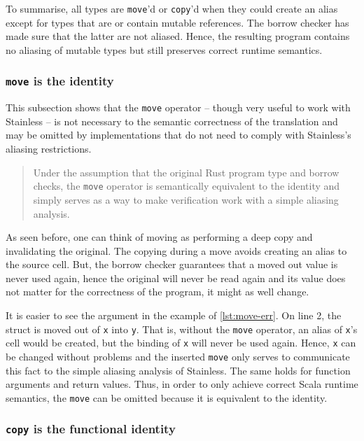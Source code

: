 To summarise, all types are \lstinline!move!'d or \lstinline!copy!'d when they
could create an alias except for types that are or contain mutable references.
The borrow checker has made sure that the latter are not aliased. Hence, the
resulting program contains no aliasing of mutable types but still preserves
correct runtime semantics.

\subsubsection{\texttt{move} is the identity}

This subsection shows that the \lstinline!move! operator -- though very useful
to work with Stainless -- is not necessary to the semantic correctness of the
translation and may be omitted by implementations that do not need to comply
with Stainless's aliasing restrictions.

\begin{quote}
Under the assumption that the original Rust program type and borrow checks, the
\lstinline!move! operator is semantically equivalent to the identity and simply
serves as a way to make verification work with a simple aliasing analysis.
\end{quote}

As seen before, one can think of moving as performing a deep copy and
invalidating the original. The copying during a move avoids creating an alias to
the source cell. But, the borrow checker guarantees that a moved out value is
never used again, hence the original will never be read again and its value does
not matter for the correctness of the program, it might as well change.

It is easier to see the argument in the example of \autoref{lst:move-err}. On
line 2, the struct is moved out of \lstinline!x! into \lstinline!y!. That is,
without the \lstinline!move! operator, an alias of \lstinline!x!'s cell would be
created, but the binding of \lstinline!x! will never be used again. Hence,
\lstinline!x! can be changed without problems and the inserted \lstinline!move!
only serves to communicate this fact to the simple aliasing analysis of
Stainless. The same holds for function arguments and return values. Thus, in
order to only achieve correct Scala runtime semantics, the \lstinline!move! can
be omitted because it is equivalent to the identity.

\subsubsection{\texorpdfstring{\texttt{copy} is the functional
identity}{copy is the functional identity}}

